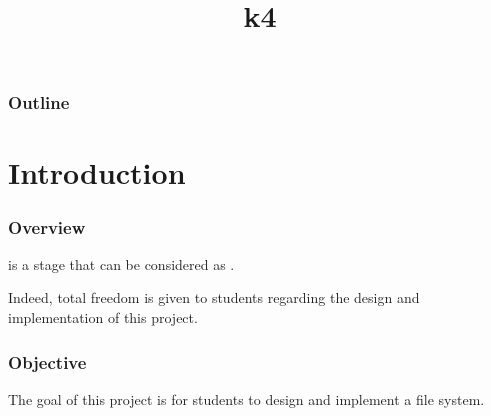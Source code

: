 %
%
%
%
%
%

%
%

%
%

\def\path{../../..}

%
%



%
%

\title{k4}

%
%



%
%

\begin{frame}
  \titlepage
\end{frame}

%
%

\begin{frame}
  \frametitle{Outline}

  \tableofcontents
\end{frame}

%
%

%
%

\section{Introduction}


\begin{frame}
  \frametitle{Overview}

   is a stage that can be considered as .

  \-

  Indeed, total freedom is given to students regarding the design and
  implementation of this project.
\end{frame}


\begin{frame}
  \frametitle{Objective}

  The goal of this project is for students to design and implement a
  file system.
\end{frame}

